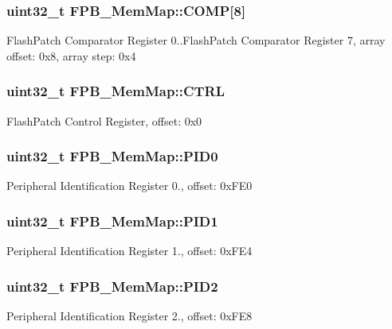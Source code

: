 \subsubsection[{C\+O\+M\+P}]{\setlength{\rightskip}{0pt plus 5cm}uint32\+\_\+t F\+P\+B\+\_\+\+Mem\+Map\+::\+C\+O\+M\+P\mbox{[}8\mbox{]}}\label{struct_f_p_b___mem_map_a09cb7f6616d521163b4cc6cf0dbd86b3}
Flash\+Patch Comparator Register 0..Flash\+Patch Comparator Register 7, array offset\+: 0x8, array step\+: 0x4 \hypertarget{struct_f_p_b___mem_map_a121a2d8da37c6ebf48cb82cedc2c2be7}{}
\subsubsection[{C\+T\+R\+L}]{\setlength{\rightskip}{0pt plus 5cm}uint32\+\_\+t F\+P\+B\+\_\+\+Mem\+Map\+::\+C\+T\+R\+L}\label{struct_f_p_b___mem_map_a121a2d8da37c6ebf48cb82cedc2c2be7}
Flash\+Patch Control Register, offset\+: 0x0 \hypertarget{struct_f_p_b___mem_map_aa60cb9ab44ceaaee9f7487d64144c1d8}{}
\subsubsection[{P\+I\+D0}]{\setlength{\rightskip}{0pt plus 5cm}uint32\+\_\+t F\+P\+B\+\_\+\+Mem\+Map\+::\+P\+I\+D0}\label{struct_f_p_b___mem_map_aa60cb9ab44ceaaee9f7487d64144c1d8}
Peripheral Identification Register 0., offset\+: 0x\+F\+E0 \hypertarget{struct_f_p_b___mem_map_a4973e107a9b956437a6e62fb154c1295}{}
\subsubsection[{P\+I\+D1}]{\setlength{\rightskip}{0pt plus 5cm}uint32\+\_\+t F\+P\+B\+\_\+\+Mem\+Map\+::\+P\+I\+D1}\label{struct_f_p_b___mem_map_a4973e107a9b956437a6e62fb154c1295}
Peripheral Identification Register 1., offset\+: 0x\+F\+E4 \hypertarget{struct_f_p_b___mem_map_a1a53923b7f5f3565b3c23fcfacc76232}{}
\subsubsection[{P\+I\+D2}]{\setlength{\rightskip}{0pt plus 5cm}uint32\+\_\+t F\+P\+B\+\_\+\+Mem\+Map\+::\+P\+I\+D2}\label{struct_f_p_b___mem_map_a1a53923b7f5f3565b3c23fcfacc76232}
Peripheral Identification Register 2., offset\+: 0x\+F\+E8 \hypertarget{struct_f_p_b___mem_map_a50469498a2399ab61bfa9c1826a1932a}{}
